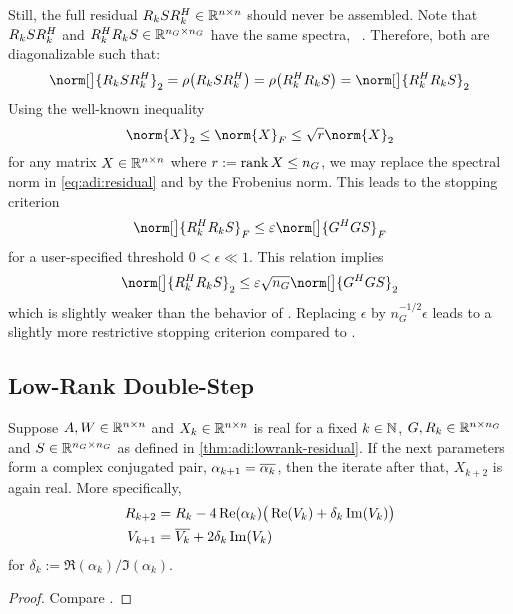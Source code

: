 Still, the full residual $R_k S R_k^H \in\mathbb{R}^{n\times n}$ should never be assembled.
Note that $R_k S R_k^H$ and $R_k^H R_k S \in \mathbb{R}^{n_G\times n_G}$ have the same spectra,
\cf~\cite[Remark on \pno~56]{Lang2015}.
Therefore, both are diagonalizable such that:
\begin{equation}
\label{eq:adi:residual}
  \norm[\big]{R_k S R_k^\HT}_2
  = \rho\big( R_k S R_k^\HT \big)
  = \rho\big( R_k^\HT R_k S \big)
  = \norm[\big]{R_k^\HT R_k S}_2
\end{equation}
Using the well-known inequality
\begin{equation}
  \norm{X}_2
  \leq \norm{X}_F
  \leq \sqrt{r} \norm{X}_2
\end{equation}
for any matrix $X\in\mathbb{R}^{n\times n}$ where $r:=\operatorname{rank} X\leq n_G$,
we may replace the spectral norm in \eqref{eq:adi:residual} and \cite[Algorithm~2.2]{Lang2017}
by the Frobenius norm.
This leads to the stopping criterion
\begin{equation}
  \norm[\big]{R_k^\HT R_k S}_F
  \leq
  \epsilon \norm[\big]{G^\HT G S}_F
\end{equation}
for a user-specified threshold $0<\epsilon \ll 1$.
This relation implies
\begin{equation}
  \norm[\big]{R_k^\HT R_k S}_2
  \leq
  \epsilon \sqrt{n_G} \norm[\big]{G^\HT G S}_2
\end{equation}
which is slightly weaker than the behavior of \cite{Lang2017}.
Replacing $\epsilon$ by $n_G^{-1/2} \epsilon$ leads to a slightly more restrictive stopping criterion compared to \cite{Lang2017}.

\subsection{Low-Rank Double-Step}
\label{sec:adi:lr2step}

\begin{proposition}
\label{thm:adi:ale:complex-pair}
  Suppose $A, W \in\mathbb{R}^{n\times n}$ and $X_k\in\mathbb{R}^{n\times n}$ is real for a fixed \mbox{$k\in\mathbb{N}$},
  \ie $G, R_k \in \mathbb{R}^{n\times n_G}$ and $S\in\mathbb{R}^{n_G\times n_G}$ as defined in \autoref{thm:adi:lowrank-residual}.
  If the next parameters form a complex conjugated pair,
  $\alpha_{k+1} = \conj{\alpha_k}$,
  then the iterate after that, $X_{k+2}$ is again real.
  More specifically,
  \begin{align*}
    R_{k+2} &= R_k - 4\Re(\alpha_k) \big(
      \Re(V_k) + \delta_k \Im(V_k)
    \big) \\
    V_{k+1} &= \conj{V_k} + 2\delta_k \Im(V_k)
  \end{align*}
  for $\delta_k := \Re(\alpha_k) / \Im(\alpha_k)$.
\end{proposition}
\begin{proof}
  Compare \cite[Theorem~4.2]{Kuerschner2016}.
\end{proof}

